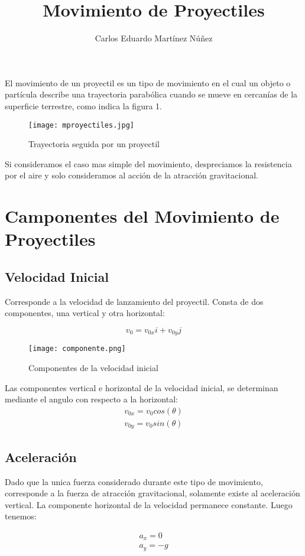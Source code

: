 \documentclass[12pt,a4paper]{article}
\title{\textbf{Movimiento de Proyectiles}}
\author{Carlos Eduardo Martínez Núñez}
\begin{document}
\maketitle
El movimiento de un proyectil es un tipo de movimiento en el cual un objeto o partícula describe una trayectoria parabólica cuando se mueve en cercanías de la superficie terrestre, como indica la figura 1. 
\begin{figure}[htbp]
\centering
\texttt{[image: mproyectiles.jpg]} 
\caption{Trayectoria seguida por un proyectil}\label{fig:figura1}
\end{figure}
Si consideramos el caso mas simple del movimiento, despreciamos la resistencia por el aire y solo consideramos al acción de la atracción gravitacional.
\section{\textbf{Camponentes del Movimiento de Proyectiles}}
\subsection{\textbf{Velocidad Inicial}}
Corresponde a la velocidad de lanzamiento del proyectil. Consta de dos componentes, una vertical y otra horizontal:

\begin{equation}
v_0=v_{0x}i+v_{0y}j
\end{equation}

\begin{figure}[htbp]
\centering
\texttt{[image: componente.png]} 
\caption{Componentes de la velocidad inicial}\label{fig:figura2}
\end{figure}
Las componentes vertical e horizontal de la velocidad inicial, se determinan mediante el angulo con respecto a la horizontal:
\begin{eqnarray}
v_{0x}=v_{0}cos(\theta)\nonumber \\
v_{0y}=v_{0}sin(\theta)
\end{eqnarray}
\subsection{Aceleración}
Dado que la unica fuerza considerado durante este tipo de movimiento, corresponde a la fuerza de atracción gravitacional, solamente existe al aceleración vertical. La componente horizontal de la velocidad permanece constante. Luego tenemos:

\begin{eqnarray}
a_{x}=0\nonumber\\
a_{y}=-g
\end{eqnarray}
\end{document}
